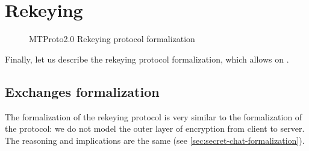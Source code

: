 \newpage
\section{Rekeying}

\begin{figure}[t]
  \setmscoptions
  \setlength{\instdist}{2.5cm}
  \begin{msc}{}



    \nextlevel[2]

    \nextlevel[4]
    \nextlevel


    \nextlevel[5]
    \nextlevel


    \nextlevel[4]
    \nextlevel[2]

  \end{msc}

  \centering
  \caption{MTProto2.0 Rekeying protocol formalization}
  \label{fig:rekeying-protocol-formalization}
\end{figure}

Finally, let us describe the rekeying protocol formalization, which allows \pfs{} on \schats{}.

\subsection{Exchanges formalization}
The formalization of the rekeying protocol is very similar to the formalization of the \schat{} protocol: we do not model the outer layer of encryption from client to server. The reasoning and implications are the same (see \cref{sec:secret-chat-formalization}).

